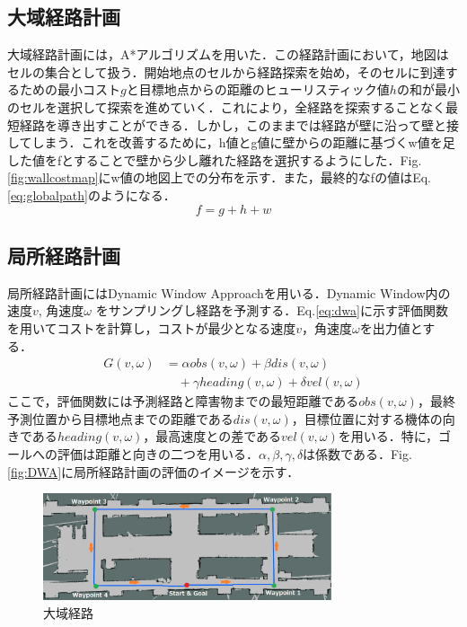 \documentclass{jarticle}
\begin{document}
\subsection{大域経路計画}
大域経路計画には，A*アルゴリズムを用いた．この経路計画において，地図はセルの集合として扱う．開始地点のセルから経路探索を始め，そのセルに到達するための最小コスト$g$と目標地点からの距離のヒューリスティック値$h$の和が最小のセルを選択して探索を進めていく．これにより，全経路を探索することなく最短経路を導き出すことができる．しかし，このままでは経路が壁に沿って壁と接してしまう．これを改善するために，h値とg値に壁からの距離に基づくw値を足した値をfとすることで壁から少し離れた経路を選択するようにした．Fig.\ref{fig:wallcostmap}にw値の地図上での分布を示す．また，最終的なfの値はEq.\ref{eq:globalpath}のようになる．
\vspace{-3mm}
\begin{equation}
	f = g + h + w
	\label{eq:globalpath}
\end{equation}
\subsection{局所経路計画} 
局所経路計画にはDynamic Window Approachを用いる．Dynamic Window内の速度$v$, 角速度$\omega$ をサンプリングし経路を予測する．Eq.\ref{eq:dwa}に示す評価関数を用いてコストを計算し，コストが最少となる速度$v$，角速度$\omega$を出力値とする．
\vspace{-3mm}
\begin{equation}
	\begin{split}
		G(v, \omega) &= \alpha obs(v, \omega) + \beta dis(v, \omega)\\
		&\quad+ \gamma heading(v, \omega) + \delta vel(v, \omega) 
	    \label{eq:dwa}
	\end{split}
\end{equation}
\vspace{-3mm}
ここで，評価関数には予測経路と障害物までの最短距離である$obs(v,\omega)$，最終予測位置から目標地点までの距離である$dis(v,\omega)$，目標位置に対する機体の向きである$heading(v,\omega)$，最高速度との差である$vel(v, \omega)$を用いる．特に，ゴールへの評価は距離と向きの二つを用いる．$α,β,γ,δ$は係数である．Fig.\ref{fig:DWA}に局所経路計画の評価のイメージを示す．
\begin{figure}
	\includegraphics[width=8.5cm]{./picture/global_path.png}
	\caption{大域経路}
	\label{fig:globalpath}
\end{figure}
\end{document}
